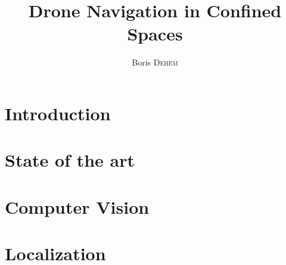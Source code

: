 \documentclass{eplmastersthesis}
\title{Drone Navigation in Confined Spaces}
\author{Boris \textsc{Dehem}}
\begin{document}






\tableofcontents

\newpage
{}
\chapter{Introduction} %


\chapter{State of the art} %


\chapter{Computer Vision} %


\chapter{Localization} %

\end{document}

